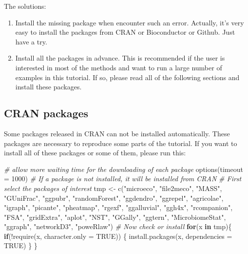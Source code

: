 \documentclass[
]{book}
\newenvironment{Shaded}{\begin{snugshade}}{\end{snugshade}}
\newcommand{\AttributeTok}[1]{\textcolor[rgb]{0.77,0.63,0.00}{#1}}
\newcommand{\CommentTok}[1]{\textcolor[rgb]{0.56,0.35,0.01}{\textit{#1}}}
\newcommand{\ConstantTok}[1]{\textcolor[rgb]{0.00,0.00,0.00}{#1}}
\newcommand{\ControlFlowTok}[1]{\textcolor[rgb]{0.13,0.29,0.53}{\textbf{#1}}}
\newcommand{\DecValTok}[1]{\textcolor[rgb]{0.00,0.00,0.81}{#1}}
\newcommand{\FunctionTok}[1]{\textcolor[rgb]{0.00,0.00,0.00}{#1}}
\newcommand{\NormalTok}[1]{#1}
\newcommand{\OtherTok}[1]{\textcolor[rgb]{0.56,0.35,0.01}{#1}}
\newcommand{\SpecialCharTok}[1]{\textcolor[rgb]{0.00,0.00,0.00}{#1}}
\newcommand{\StringTok}[1]{\textcolor[rgb]{0.31,0.60,0.02}{#1}}
\begin{document}
The solutions:

\begin{enumerate}
\def\labelenumi{\arabic{enumi}.}
\item
  Install the missing package when encounter such an error. Actually, it's very easy to install the packages from CRAN or Bioconductor or Github. Just have a try.
\item
  Install all the packages in advance.
  This is recommended if the user is interested in most of the methods and want to run a large number of examples in this tutorial.
  If so, please read all of the following sections and install these packages.
\end{enumerate}

\hypertarget{cran-packages}{%
\subsection{CRAN packages}\label{cran-packages}}

Some packages released in CRAN can not be installed automatically.
These packages are necessary to reproduce some parts of the tutorial.
If you want to install all of these packages or some of them, please run this:

\begin{Shaded}
\begin{Highlighting}[]
\CommentTok{\# allow more waiting time for the downloading of each package}
\FunctionTok{options}\NormalTok{(}\AttributeTok{timeout =} \DecValTok{1000}\NormalTok{)}
\CommentTok{\# If a package is not installed, it will be installed from CRAN}
\CommentTok{\# First select the packages of interest}
\NormalTok{tmp }\OtherTok{\textless{}{-}} \FunctionTok{c}\NormalTok{(}\StringTok{"microeco"}\NormalTok{, }\StringTok{"file2meco"}\NormalTok{, }\StringTok{"MASS"}\NormalTok{, }\StringTok{"GUniFrac"}\NormalTok{, }\StringTok{"ggpubr"}\NormalTok{, }\StringTok{"randomForest"}\NormalTok{, }\StringTok{"ggdendro"}\NormalTok{, }\StringTok{"ggrepel"}\NormalTok{, }\StringTok{"agricolae"}\NormalTok{, }\StringTok{"igraph"}\NormalTok{, }\StringTok{"picante"}\NormalTok{, }\StringTok{"pheatmap"}\NormalTok{, }\StringTok{"rgexf"}\NormalTok{, }
    \StringTok{"ggalluvial"}\NormalTok{, }\StringTok{"ggh4x"}\NormalTok{, }\StringTok{"rcompanion"}\NormalTok{, }\StringTok{"FSA"}\NormalTok{, }\StringTok{"gridExtra"}\NormalTok{, }\StringTok{"aplot"}\NormalTok{, }\StringTok{"NST"}\NormalTok{, }\StringTok{"GGally"}\NormalTok{, }\StringTok{"ggtern"}\NormalTok{, }\StringTok{"MicrobiomeStat"}\NormalTok{, }\StringTok{"ggraph"}\NormalTok{, }\StringTok{"networkD3"}\NormalTok{, }\StringTok{"poweRlaw"}\NormalTok{)}
\CommentTok{\# Now check or install}
\ControlFlowTok{for}\NormalTok{(x }\ControlFlowTok{in}\NormalTok{ tmp)\{}
    \ControlFlowTok{if}\NormalTok{(}\SpecialCharTok{!}\FunctionTok{require}\NormalTok{(x, }\AttributeTok{character.only =} \ConstantTok{TRUE}\NormalTok{)) \{}
        \FunctionTok{install.packages}\NormalTok{(x, }\AttributeTok{dependencies =} \ConstantTok{TRUE}\NormalTok{)}
\NormalTok{    \}}
\NormalTok{\}}
\end{Highlighting}
\end{Shaded}
\end{document}
